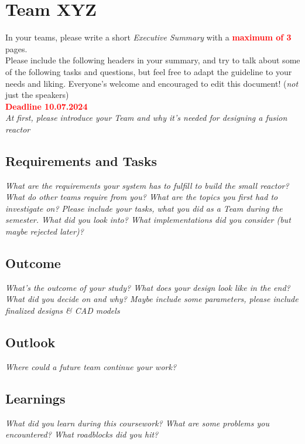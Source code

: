 \section{Team XYZ}

In your teams, please write a short \textit{Executive Summary} with a \textbf{\textcolor{red}{maximum of 3}} pages.\\
Please include the following headers in your summary, and try to talk about some of the following tasks and questions, but feel free to adapt the guideline to your needs and liking. Everyone's welcome and encouraged to edit this document! (\textit{not} just the speakers)\\

\textbf{\textcolor{red}{Deadline 10.07.2024}}\\

\textit{At first, please introduce your Team and why it's needed for designing a fusion reactor}

\subsection{Requirements and Tasks}

\textit{What are the requirements your system has to fulfill to build the small reactor? What do other teams require from you? What are the topics you first had to investigate on? Please include your tasks, what you did as a Team during the semester. What did you look into? What implementations did you consider (but maybe rejected later)?}\\


\subsection{Outcome}

\textit{What's the outcome of your study? What does your design look like in the end? What did you decide on and why? Maybe include some parameters, please include finalized designs \& CAD models}

\subsection{Outlook}

\textit{Where could a future team continue your work?}

\subsection{Learnings}

\textit{What did you learn during this coursework? What are some problems you encountered? What roadblocks did you hit?}

